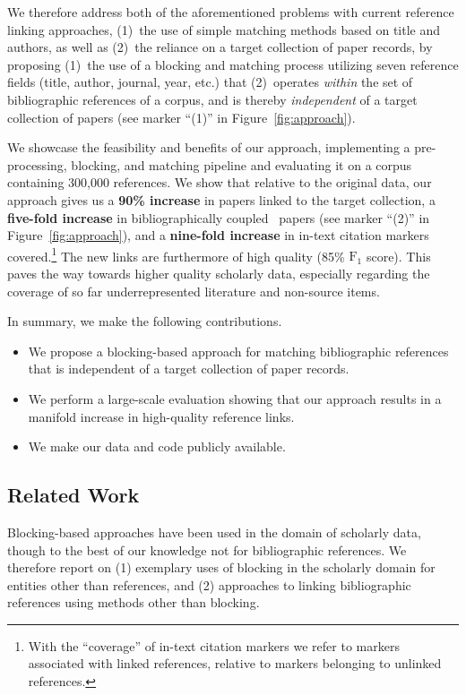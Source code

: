 We therefore address both of the aforementioned problems with current reference linking approaches, (1)~the use of simple matching methods based on title and authors, as well as (2)~the reliance on a target collection of paper records, by proposing (1)~the use of a blocking and matching process utilizing seven reference fields (title, author, journal, year, etc.) that (2)~operates \emph{within} the set of bibliographic references of a corpus, and is thereby \emph{independent} of a target collection of papers (see marker ``(1)'' in Figure~\ref{fig:approach}).

We showcase the feasibility and benefits of our approach, implementing a pre-processing, blocking, and matching pipeline and evaluating it on a corpus containing 300,000 references.
We show that relative to the original data, our approach gives us a \textbf{90\% increase} in papers linked to the target collection, a \textbf{five-fold increase} in bibliographically coupled~\cite{Boyack2010} papers (see marker ``(2)'' in Figure~\ref{fig:approach}), and a \textbf{nine-fold increase} in in-text citation markers covered.\footnote{With the ``coverage'' of in-text citation markers we refer to markers associated with linked references, relative to markers belonging to unlinked references.} The new links are furthermore of high quality (85\% $\text{F}_1$ score). This paves the way towards higher quality scholarly data, especially regarding the coverage of so far underrepresented literature and non-source items.

In summary, we make the following contributions.

\begin{itemize}
    \item We propose a blocking-based approach for matching bibliographic references that is independent of a target collection of paper records.
    \item We perform a large-scale evaluation showing that our approach results in a manifold increase in high-quality reference links.
    \item We make our data and code publicly available.
\end{itemize}

\subsection{Related Work}
Blocking-based approaches have been used in the domain of scholarly data, though to the best of our knowledge not for bibliographic references. We therefore report on (1) exemplary uses of blocking in the scholarly domain for entities other than references, and (2) approaches to linking bibliographic references using methods other than blocking.

